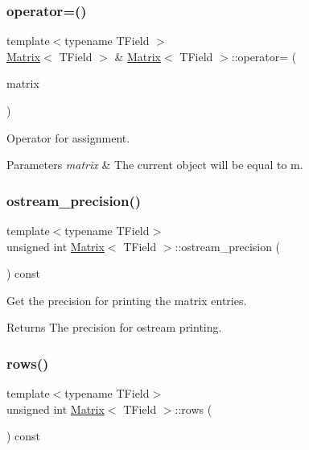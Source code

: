 \subsubsection{\texorpdfstring{operator=()}{operator=()}}
{\footnotesize\ttfamily template$<$typename T\+Field $>$ \\
\mbox{\hyperlink{classMatrix}{Matrix}}$<$ T\+Field $>$ \& \mbox{\hyperlink{classMatrix}{Matrix}}$<$ T\+Field $>$\+::operator= (\begin{DoxyParamCaption}\item[{\mbox{\hyperlink{classMatrix}{Matrix}}$<$ T\+Field $>$}]{matrix }\end{DoxyParamCaption})}



Operator for assignment. 


\begin{DoxyParams}{Parameters}
{\em matrix} & The current object will be equal to m. \\
\hline
\end{DoxyParams}
\mbox{\label{classMatrix_aa93bff81f970ace86444f3f10125f4e2}} 
\subsubsection{\texorpdfstring{ostream\+\_\+precision()}{ostream\_precision()}}
{\footnotesize\ttfamily template$<$typename T\+Field$>$ \\
unsigned int \mbox{\hyperlink{classMatrix}{Matrix}}$<$ T\+Field $>$\+::ostream\+\_\+precision (\begin{DoxyParamCaption}{ }\end{DoxyParamCaption}) const\hspace{0.3cm}{\ttfamily [inline]}}



Get the precision for printing the matrix entries. 

\begin{DoxyReturn}{Returns}
The precision for ostream printing. 
\end{DoxyReturn}
\mbox{\label{classMatrix_a0e6439550b0aa4f6d66c5a31bfd6405c}} 
\subsubsection{\texorpdfstring{rows()}{rows()}}
{\footnotesize\ttfamily template$<$typename T\+Field$>$ \\
unsigned int \mbox{\hyperlink{classMatrix}{Matrix}}$<$ T\+Field $>$\+::rows (\begin{DoxyParamCaption}{ }\end{DoxyParamCaption}) const\hspace{0.3cm}{\ttfamily [inline]}}



